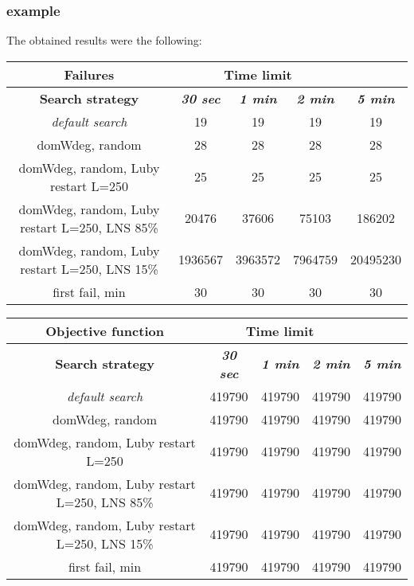\subsubsection{example}
The obtained results were the following:
{
\renewcommand{\arraystretch}{2}
\begin{longtable}[h]{| c | c | c | c | c |}
    \hline
    \textbf{Failures} & \multicolumn{3}{c}{Time limit} & \\
    \hline
    \textbf{Search strategy} & \textbf{\textit{30 sec}} & \textbf{\textit{1 min}} & \textbf{\textit{2 min}} & \textbf{\textit{5 min}} \\
    \hline
    \endhead
    \textit{default search}                       &      19 &      19 &      19 &       19 \\
    \hline
    domWdeg, random                               &      28 &      28 &      28 &       28 \\
    \hline
    domWdeg, random, Luby restart L=250           &      25 &      25 &      25 &       25 \\
    \hline
    domWdeg, random, Luby restart L=250, LNS 85\% &   20476 &   37606 &   75103 &   186202 \\
    \hline
    domWdeg, random, Luby restart L=250, LNS 15\% & 1936567 & 3963572 & 7964759 & 20495230 \\
    \hline
    first fail, min                               &      30 &      30 &      30 &       30 \\
    \hline
\end{longtable}
}

{
\renewcommand{\arraystretch}{2}
\begin{longtable}[h]{| c | c | c | c | c |}
    \hline
    \textbf{Objective function} & \multicolumn{3}{c}{Time limit} & \\
    \hline
    \textbf{Search strategy} & \textbf{\textit{30 sec}} & \textbf{\textit{1 min}} & \textbf{\textit{2 min}} & \textbf{\textit{5 min}} \\
    \hline
    \endhead
    \textit{default search}                       & 419790 & 419790 & 419790 & 419790 \\
    \hline
    domWdeg, random                               & 419790 & 419790 & 419790 & 419790 \\
    \hline
    domWdeg, random, Luby restart L=250           & 419790 & 419790 & 419790 & 419790 \\
    \hline
    domWdeg, random, Luby restart L=250, LNS 85\% & 419790 & 419790 & 419790 & 419790 \\
    \hline
    domWdeg, random, Luby restart L=250, LNS 15\% & 419790 & 419790 & 419790 & 419790 \\
    \hline
    first fail, min                               & 419790 & 419790 & 419790 & 419790 \\
    \hline
\end{longtable}
}